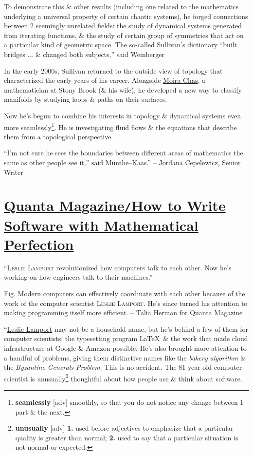 \documentclass[oneside]{book}
\numberwithin{equation}{section}
\begin{document}
To demonstrate this \& other results (including one related to the mathematics underlying a universal property of certain chaotic systems), he forged connections between 2 seemingly unrelated fields: the study of dynamical systems generated from iterating functions, \& the study of certain group of symmetries that act on a particular kind of geometric space. The so-called Sullivan's dictionary ``built bridges $\ldots$ \& changed both subjects,'' said Weinberger

In the early 2000s, Sullivan returned to the outside view of topology that characterized the early years of his career. Alongside \href{https://www.math.stonybrook.edu/~moira/}{Moira Chas}, a mathematician at Stony Brook (\& his wife), he developed a new way to classify manifolds by studying loops \& paths on their surfaces.

Now he's begun to combine his interests in topology \& dynamical systems even more seamlessly\footnote{\textbf{seamlessly} [adv] smoothly, so that you do not notice any change between 1 part \& the next.}. He is investigating fluid flows \& the equations that describe them from a topological perspective.

``I'm not sure he sees the boundaries between different areas of mathematics the same as other people see it,'' said Munthe--Kaas.'' -- Jordana Cepelewicz, Senior Writer

\section{\href{https://www.quantamagazine.org/computing-expert-says-programmers-need-more-math-20220517/}{Quanta Magazine\texttt{/}How to Write Software with Mathematical Perfection}}
``\textsc{Leslie Lamport} revolutionized how computers talk to each other. Now he's working on how engineers talk to their machines.''

\textsf{Fig. Modern computers can effectively coordinate with each other because of the work of the computer scientist \textsc{Leslie Lamport}. He's since turned his attention to making programming itself more efficient.} -- Talia Herman for Quanta Magazine

``\href{http://www.lamport.org/}{Leslie Lamport} may not be a household name, but he's behind a few of them for computer scientists: the typesetting program \LaTeX\ \& the work that made cloud infrastructure at Google \& Amazon possible. He's also brought more attention to a handful of problems, giving them distinctive names like the \textit{bakery algorithm} \& the \textit{Byzantine Generals Problem}. This is no accident. The 81-year-old computer scientist is unusually\footnote{\textbf{unusually} [adv] \textbf{1.} used before adjectives to emphasize that a particular quality is greater than normal; \textbf{2.} used to say that a particular situation is not normal or expected.} thoughtful about how people use \& think about software.
\end{document}
